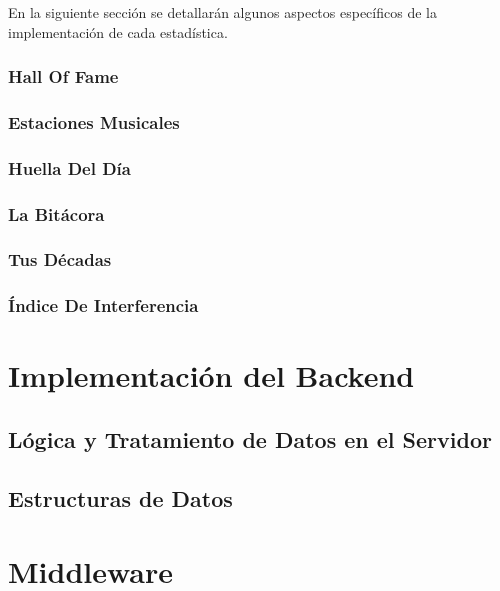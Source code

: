 En la siguiente sección se detallarán algunos aspectos específicos de la implementación de cada estadística.

\subsubsection*{Hall Of Fame}
\subsubsection*{Estaciones Musicales}
\subsubsection*{Huella Del Día}
\subsubsection*{La Bitácora}
\subsubsection*{Tus Décadas}
\subsubsection*{Índice De Interferencia}


\section{Implementación del Backend}

\subsection{Lógica y Tratamiento de Datos en el Servidor}

\subsection{Estructuras de Datos}

\section{Middleware}




